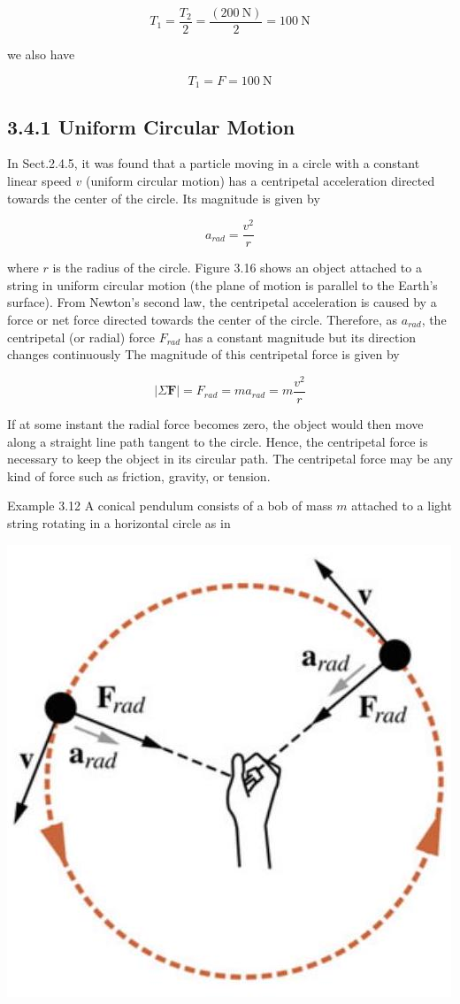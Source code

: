 \documentclass[10pt]{article}
\begin{document}
$$
T_{1}=\frac{T_{2}}{2}=\frac{(200 \mathrm{~N})}{2}=100 \mathrm{~N}
$$

we also have

$$
T_{1}=F=100 \mathrm{~N}
$$

\subsection*{3.4.1 Uniform Circular Motion}
In Sect.2.4.5, it was found that a particle moving in a circle with a constant linear speed $v$ (uniform circular motion) has a centripetal acceleration directed towards the center of the circle. Its magnitude is given by

$$
a_{r a d}=\frac{v^{2}}{r}
$$

where $r$ is the radius of the circle. Figure 3.16 shows an object attached to a string in uniform circular motion (the plane of motion is parallel to the Earth's surface). From Newton's second law, the centripetal acceleration is caused by a force or net force directed towards the center of the circle. Therefore, as $a_{r a d}$, the centripetal (or radial) force $F_{r a d}$ has a constant magnitude but its direction changes continuously The magnitude of this centripetal force is given by

$$
|\Sigma \mathbf{F}|=F_{r a d}=m a_{r a d}=m \frac{v^{2}}{r}
$$

If at some instant the radial force becomes zero, the object would then move along a straight line path tangent to the circle. Hence, the centripetal force is necessary to keep the object in its circular path. The centripetal force may be any kind of force such as friction, gravity, or tension.

Example 3.12 A conical pendulum consists of a bob of mass $m$ attached to a light string rotating in a horizontal circle as in

\begin{center}
\includegraphics[max width=\textwidth]{2024_09_13_db1f357d2aad0a03eb2eg-057(2)}
\end{center}
\end{document}
